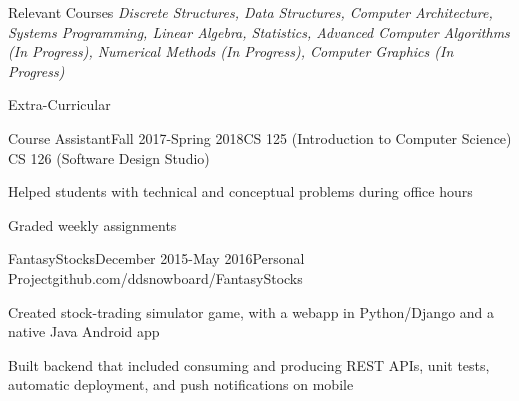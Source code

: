 \documentclass{resume} %
\begin{document}
    \begin{rSection}{Relevant Courses}
        \textit{Discrete Structures, Data Structures, Computer Architecture, Systems Programming, Linear Algebra, Statistics, Advanced Computer Algorithms (In Progress), Numerical Methods (In Progress), Computer Graphics (In Progress)}

    \end{rSection}


    \begin{rSection}{Extra-Curricular} \itemsep -3pt
        \begin{rSubsection}{Course Assistant}{Fall 2017-Spring 2018}{CS 125 (Introduction to Computer Science) \\ CS 126 (Software Design Studio)}{}{}
        \item Helped students with technical and conceptual problems during office hours
        \item Graded weekly assignments
        \end{rSubsection}

        \begin{rSubsection}{FantasyStocks}{December 2015-May 2016}{Personal Project}{github.com/ddsnowboard/FantasyStocks}
        \item Created stock-trading simulator game, with a webapp in Python/Django and a native Java Android app
        \item Built backend that included consuming and producing REST APIs, unit tests, automatic deployment, and push notifications on mobile
        \end{rSubsection}

    \end{rSection}

    
\end{document}
